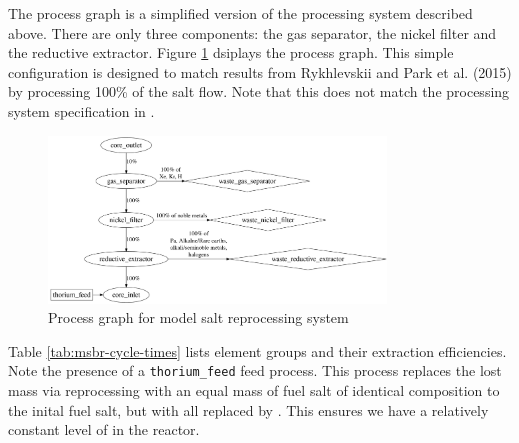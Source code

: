 The process graph is a simplified version of the processing system described 
above. There are only three components: the gas separator, the nickel filter and
the reductive extractor. Figure \ref{fig:process-graph} dsiplays the process
graph. This simple configuration is designed to match results from Rykhlevskii
and Park et al. (2015) \cite{park_whole_2015} by processing 100\% of the salt
flow. Note that this does not match the processing system specification in
\cite{robertson_conceptual_1971}.

\begin{figure}[htpb]
    \centering
    \includegraphics[width=0.8\textwidth]{figs/ch4/process_graph.png}
    \caption{Process graph for model salt reprocessing system}
    \label{fig:process-graph}
\end{figure}

Table \ref{tab:msbr-cycle-times} lists element groups and their extraction
efficiencies. Note the presence of a \verb.thorium_feed. feed process. This
process replaces the lost mass via reprocessing with an equal mass of fuel salt
of identical composition to the inital fuel salt, but with all 
replaced by . This ensures we have a relatively constant level of
 in the reactor.

